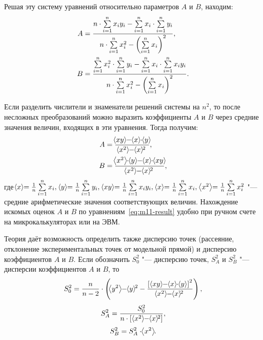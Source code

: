 \documentclass[a4paper, 12pt]{extarticle}
\newcommand{\isum}{\sum\limits_{i=1}^{n}}
\begin{document}
Решая эту систему уравнений относительно параметров $A$ и $B$, находим: 
\begin{equation}
\label{eq:m11-solution}
\aligned
A &= \frac{n \cdot \isum x_i y_i - \isum x_i \cdot \isum y_i}{n \cdot \isum x_i^2 - \left( \isum x_i \right)^2}, \\
B &= \frac{\isum x_i^2 \cdot \isum y_i - \isum x_i \cdot \isum x_i y_i}{n \cdot \isum x_i^2 - \left( \isum x_i \right)^2}. %
\endaligned
\end{equation}

Если разделить числители и знаменатели решений системы на $n^2$, то после несложных преобразований можно выразить коэффициенты $A$ и $B$ через средние значения величин, входящих в эти уравнения. Тогда получим: %
\begin{equation}
\label{eq:m11-result}
\aligned
A &= \frac{\MTDMean{x  y} - \MTDMean{x} \cdot \MTDMean{y}}{\MTDMean{x^2} - \MTDMean{x}^2}, \\
B &= \frac{\MTDMean{x^2} \cdot \MTDMean{y} - \MTDMean{x} \cdot \MTDMean{x  y}}{\MTDMean{x^2} - \MTDMean{x}^2},
\endaligned
\end{equation}
где 
$
\MTDMean{x} = \frac{1}{n} \isum x_i, \ \MTDMean{y} = \frac{1}{n} \isum y_i, \ \MTDMean{x  y} = \frac{1}{n} \isum x_i y_i, \ \MTDMean{x} = \frac{1}{n} \isum x_i,\ \MTDMean{x^2} = \frac{1}{n}  \isum x_i^2
$
"--- средние арифметические значения соответствующих величин. Нахождение искомых оценок $A$ и $B$ по уравнениям~\eqref{eq:m11-result} удобно при ручном счете на микрокалькуляторах или на ЭВМ. 

Теория даёт возможность определить также дисперсию точек (рассеяние, отклонение экспериментальных точек от модельной прямой) и дисперсию коэффициентов $A$ и $B$. Если обозначить $S_0^2$ "--- дисперсию точек, $S_A^2$  и $S_B^2$  "--- дисперсии коэффициентов $A$ и $B$, то 
\begin{equation}
\label{eq:m11-S_0^2} %
S_0^2 = \frac{n}{n - 2} \cdot \left( \MTDMean{y^2} - \MTDMean{y}^2 - \frac{\left[ \hspace{3pt} \MTDMean{x y} - \MTDMean{x} \cdot \MTDMean{y} \hspace{3pt} \right] ^2}{\MTDMean{x^2} - \MTDMean{x}^2} \right), %
\end{equation}
\begin{equation}
\label{eq:m11-S_A^2}
S_A^2 =\frac{S_0^2}{n \cdot \left[ \hspace{3pt} \MTDMean{x^2} - \MTDMean{x}^2 \right]},
\end{equation}
\begin{equation}
\label{eq:m11-S_B^2}
S_B^2 = S_A^2 \cdot \hspace{-3pt}\left<x^2\right>\hspace{-3pt}.
\end{equation}
\end{document}
